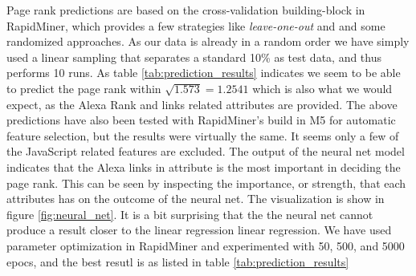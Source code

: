 Page rank predictions are based on the cross-validation building-block in RapidMiner, which provides a few strategies like {\it leave-one-out} and and some randomized approaches. As our data is already in a random order we have simply used a linear sampling that separates a standard 10\% as test data, and thus performs 10 runs. As table \ref{tab:prediction_results} indicates we seem to be able to predict the page rank within \(\sqrt{1.573} = 1.2541\) which is also what we would expect, as the Alexa Rank and links related attributes are provided. The above predictions have also been tested with RapidMiner's build in M5 for automatic feature selection, but the results were virtually the same. It seems only a few of the JavaScript related features are excluded.
The output of the neural net model indicates that the Alexa links in attribute is the most important in deciding the page rank. This can be seen by inspecting the importance, or strength, that each attributes has on the outcome of the neural net. The visualization is show in figure \ref{fig:neural_net}. It is a bit surprising that the the neural net cannot produce a result closer to the linear regression linear regression. We have used parameter optimization in RapidMiner and experimented with 50, 500, and 5000 epocs, and the best resutl is as listed in table \ref{tab:prediction_results}

